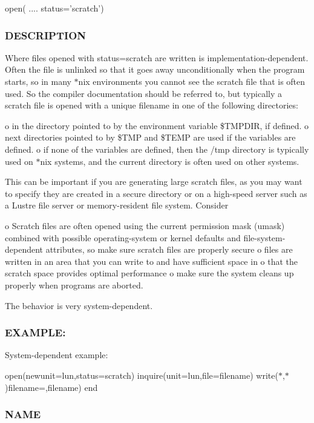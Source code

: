 \begin{DoxyVerb} open( .... status='scratch')
\end{DoxyVerb}
 \subsubsection*{D\+E\+S\+C\+R\+I\+P\+T\+I\+ON}

Where files opened with status=\textquotesingle{}scratch\textquotesingle{} are written is implementation-\/dependent. Often the file is unlinked so that it goes away unconditionally when the program starts, so in many $\ast$nix environments you cannot see the scratch file that is often used. So the compiler documentation should be referred to, but typically a scratch file is opened with a unique filename in one of the following directories\+:

o in the directory pointed to by the environment variable \$\+T\+M\+P\+D\+IR, if defined. o next directories pointed to by \$\+T\+MP and \$\+T\+E\+MP are used if the variables are defined. o if none of the variables are defined, then the /tmp directory is typically used on $\ast$nix systems, and the current directory is often used on other systems.

This can be important if you are generating large scratch files, as you may want to specify they are created in a secure directory or on a high-\/speed server such as a Lustre file server or memory-\/resident file system. Consider

o Scratch files are often opened using the current permission mask (umask) combined with possible operating-\/system or kernel defaults and file-\/system-\/dependent attributes, so make sure scratch files are properly secure o files are written in an area that you can write to and have sufficient space in o that the scratch space provides optimal performance o make sure the system cleans up properly when programs are aborted.

The behavior is very system-\/dependent.

\subsubsection*{E\+X\+A\+M\+P\+LE\+:}

System-\/dependent example\+:

open(newunit=lun,status=\textquotesingle{}scratch\textquotesingle{}) inquire(unit=lun,file=filename) write($\ast$,$\ast$)\textquotesingle{}filename=\textquotesingle{},filename) end \subsubsection*{N\+A\+ME}


